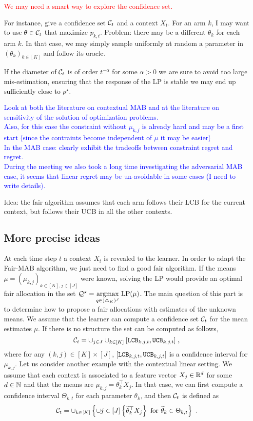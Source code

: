 \textcolor{red}{We may need a smart way to explore the confidence set.}

For instance, give a confidence set $\mathcal{C}_t$ and a context $X_t$. For an arm $k$, I may want to use $\theta \in \mathcal{C}_t$ that maximize $p_{k,t}$. Problem: there may be a different $\theta_k$ for each arm $k$. In that case, we may simply sample uniformly at random a parameter in $(\theta_k)_{k \in [K]}$ and follow its oracle.

If the diameter of $\mathcal{C}_t$ is of order $t^{-\alpha}$ for some $\alpha>0$ we are sure to avoid too large mis-estimation, ensuring that the response of the LP is stable we may end up sufficiently close to $p^\star$. 

\textcolor{blue}{Look at both the literature on contextual MAB and at the literature on sensitivity of the solution of optimization problems.\\
Also, for this case the constraint without $\mu_{k,j}$ is already hard and may be a first start (since the contraints become independent of $\mu$ it may be easier)\\
In the MAB case: clearly exhibit the tradeoffs between constraint regret and regret.\\
During the meeting we also took a long time investigating the adversarial MAB case, it seems that linear regret may be un-avoidable in some cases (I need to write details).}

Idea: the fair algorithm assumes that each arm follows their LCB for the current context, but follows their UCB in all the other contexts.


\subsection{More precise ideas}

At each time step $t$ a context $X_t$ is revealed to the learner. In order to adapt the Fair-MAB algorithm, we just need to find a good fair algorithm. If the means $\mu=(\mu_{k, j})_{k \in [K], j \in [J]}$ were known, solving the LP would provide an optimal fair allocation in the set $\mathcal{Q}^\star=\underset{q \in (\triangle_K)^J}{\text{argmax}}\; \text{LP}(\mu)$. The main question of this part is to determine how to propose a fair allocations with estimates of the unknown means. We assume that the learner can compute a confidence set $\mathcal{C}_t$ for the mean estimates $\mu$. If there is no structure the set can be computed as follows,
\[\mathcal{C}_t = \cup_{j \in J} \cup_{k \in [K]} [\texttt{LCB}_{k, j, t}, \texttt{UCB}_{k, j, t}]\;, \]
where for any $(k, j)\in [K]\times [J]$, $[\texttt{LCB}_{k, j, t}, \texttt{UCB}_{k, j, t}]$ is a confidence interval for $\mu_{k, j}$. Let us consider another example with the contextual linear setting. We assume that each context is associated to a feature vector $X_j \in \mathbb{R}^d$ for some $d\in \mathbb{N}$ and that the means are $\mu_{k,j}=\theta_k^\top X_j$. In that case, we can first compute a confidence interval $\Theta_{k, t}$ for each parameter $\theta_k$, and then $\mathcal{C}_t$ is defined as 
\[\mathcal{C}_t = \cup_{k \in [K]} \left\{\cup{j \in [J]}\left\{ \widetilde{\theta}_k^\top X_j \right\} \text{ for } \widetilde{\theta}_k \in \Theta_{k,t}\right\} \;. \]

